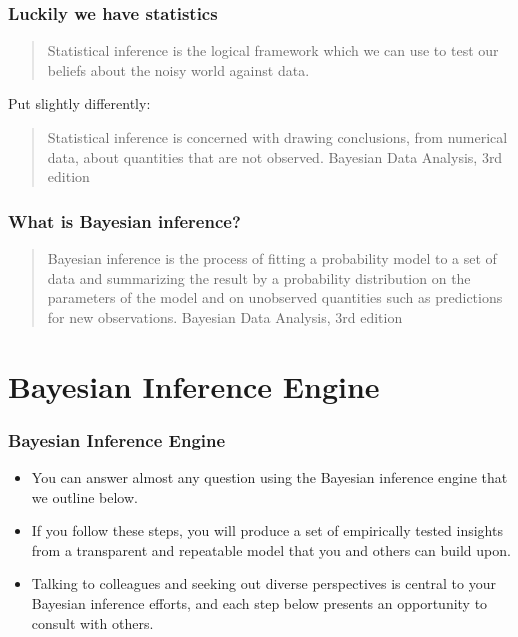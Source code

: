 \documentclass{beamer}
\begin{document}
\begin{frame}
\frametitle{Luckily we have statistics}

\begin{quote}
Statistical inference is the logical framework which we can use to test our beliefs about the noisy world against data.
\end{quote}

Put slightly differently: 
\begin{quote}
Statistical inference is concerned with drawing conclusions, from numerical data, about quantities that are not observed.
Bayesian Data Analysis, 3rd edition
\end{quote}

\end{frame}

\begin{frame}
\frametitle{What is Bayesian inference?}

\begin{quote}
Bayesian inference is the process of fitting a probability model to a set of data and summarizing the result by a probability distribution on the parameters of the model and on unobserved quantities such as predictions for new observations.
Bayesian Data Analysis, 3rd edition
\end{quote}

\end{frame}



\section{Bayesian Inference Engine}

\begin{frame}
\frametitle{Bayesian Inference Engine}

\begin{itemize}

\item You can answer almost any question using the Bayesian inference engine that we outline below.
 
\item If you follow these steps, you will produce a set of empirically tested insights from a transparent and repeatable model that you and others can build upon. 

\item Talking to colleagues and seeking out diverse perspectives is central to your Bayesian inference efforts, and each step below presents an opportunity to consult with others.

\end{itemize}

\end{frame}
\end{document}

